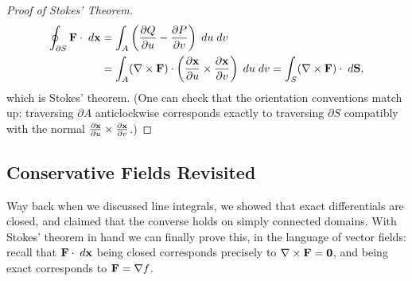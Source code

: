 \documentclass[a4paper]{scrartcl}
\begin{document}
\begin{proof}[Proof of Stokes' Theorem]
	\begin{align*}
		\oint_{\partial S} \mathbf{F} \cdot \; d \mathbf{x} &= \int_A \left(\frac{\partial Q}{\partial u} - \frac{\partial P}{\partial v}\right) \; d u \; d v \\
		&= \int_A (\nabla \times \mathbf{F}) \cdot \left(\frac{\partial \mathbf{x}}{\partial u} \times \frac{\partial \mathbf{x}}{\partial v}\right) \; d u \; d v = \int_S (\nabla \times \mathbf{F}) \cdot \; d \mathbf{S},
	\end{align*}
	which is Stokes' theorem. (One can check that the orientation conventions match up: traversing $\partial A$ anticlockwise corresponds exactly to traversing $\partial S$ compatibly with the normal $\frac{\partial \mathbf{x}}{\partial u} \times \frac{\partial \mathbf{x}}{\partial v}$.)
\end{proof}

\subsection{Conservative Fields Revisited}

Way back when we discussed line integrals, we showed that exact differentials are closed, and claimed that the converse holds on simply connected domains. With Stokes' theorem in hand we can finally prove this, in the language of vector fields: recall that $\mathbf{F} \cdot \; d \mathbf{x}$ being closed corresponds precisely to $\nabla \times \mathbf{F} = \mathbf{0}$, and being exact corresponds to $\mathbf{F} = \nabla f$.
\end{document}
